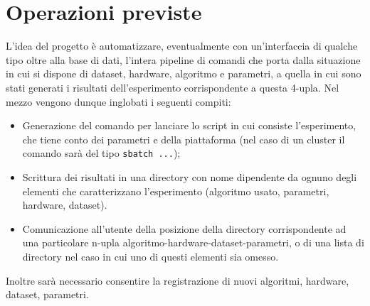 \documentclass{article}
\begin{document}
\section{Operazioni previste}
L'idea del progetto è automatizzare, eventualmente con un'interfaccia di qualche tipo oltre alla base di dati, l'intera pipeline di comandi che porta dalla situazione in cui si dispone di dataset, hardware, algoritmo e parametri, a quella in cui sono stati generati i risultati dell'esperimento corrispondente a questa 4-upla. Nel mezzo vengono dunque inglobati i seguenti compiti:
\begin{itemize}
    \item Generazione del comando per lanciare lo script in cui consiste l'esperimento, che tiene conto dei parametri e della piattaforma (nel caso di un cluster il comando sarà del tipo \texttt{sbatch ...});
    \item Scrittura dei risultati in una directory con nome dipendente da ognuno degli elementi che caratterizzano l'esperimento (algoritmo usato, parametri, hardware, dataset).
    \item Comunicazione all'utente della posizione della directory corrispondente ad una particolare n-upla algoritmo-hardware-dataset-parametri, o di una lista di directory nel caso in cui uno di questi elementi sia omesso.
\end{itemize}
Inoltre sarà necessario consentire la registrazione di nuovi algoritmi, hardware, dataset, parametri.
\end{document}
